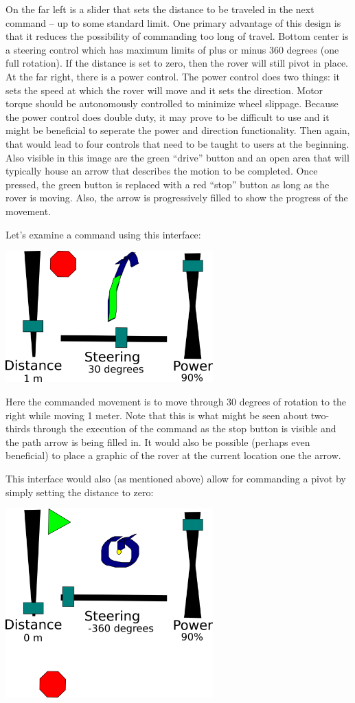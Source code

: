 \documentclass[letterpaper,10pt]{article}
\begin{document}
    On the far left is a slider that sets the distance to be traveled in the next command -- up to some standard limit.  One primary advantage of this design is that it reduces the possibility of commanding too long of travel.  Bottom center is a steering control which has maximum limits of plus or minus 360 degrees (one full rotation).  If the distance is set to zero, then the rover will still pivot in place.  At the far right, there is a power control.  The power control does two things: it sets the speed at which the rover will move and it sets the direction.  Motor torque should be autonomously controlled to minimize wheel slippage.  Because the power control does double duty, it may prove to be difficult to use and it might be beneficial to seperate the power and direction functionality.  Then again, that would lead to four controls that need to be taught to users at the beginning.  Also visible in this image are the green ``drive'' button and an open area that will typically house an arrow that describes the motion to be completed.  Once pressed, the green button is replaced with a red ``stop'' button as long as the rover is moving.  Also, the arrow is progressively filled to show the progress of the movement.  
    
    Let's examine a command using this interface:
    
    \includegraphics[width=8cm]{seperated_turning_running}
    
    Here the commanded movement is to move through 30 degrees of rotation to the right while moving 1 meter.  Note that this is what might be seen about two-thirds through the execution of the command as the stop button is visible and the path arrow is being filled in.  It would also be possible (perhaps even beneficial) to place a graphic of the rover at the current location one the arrow.
    
    This interface would also (as mentioned above) allow for commanding a pivot by simply setting the distance to zero:
    
    \includegraphics[width=8cm]{seperated_pivot}
    
\end{document}
